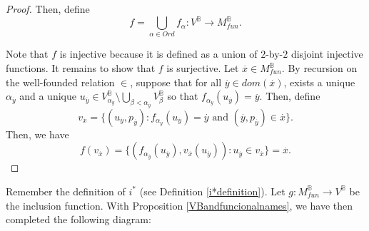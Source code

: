 \documentclass[10pt,longbibliography]{article}
\newcommand{\Po}{\mathbb{P}}
\newcommand{\B}{\mathbb{B}}
\newcommand{\ydot}{\overset{.}{y}}
\newcommand{\xdot}{\overset{.}{x}}
\begin{document}
\begin{proof}
	Then, define
	$$f = \underset{\alpha \in Ord}{\bigcup} f_{\alpha}: V^{\B} \to M^{\B}_{fun}.$$      
	
	Note that $f$ is injective because it is defined as a union of $2$-by-$2$ disjoint injective functions. It remains to show that $f$ is surjective.  Let $\xdot \in M^{\B}_{fun}$. By recursion on the well-founded relation $\in$, suppose that for all $\ydot \in dom(\xdot)$, exists a unique $\alpha_{\ydot}$ and a unique $u_{\ydot} \in V^{\B}_{\alpha_{\ydot}} \setminus \underset{\beta < \alpha_{\ydot}}{\bigcup} V^{\B}_{\beta}$ so that $f_{\alpha_{\ydot}}(u_{\ydot}) = \ydot$. Then, define 
	$$v_{\xdot} = \{(u_{\ydot}, p_{\ydot}): f_{\alpha_{\ydot}}(u_{\ydot}) = \ydot \text{ and }(\ydot,p_{\ydot}) \in \xdot\}.$$
	Then, we have $$f(v_{\xdot}) = \{(f_{\alpha_{\ydot}}(u_{\ydot}), v_{\xdot}(u_{\ydot})): u_{\ydot} \in v_{\xdot}\} = \xdot.$$
\end{proof}

Remember the definition of $i^{*}$ (see Definition \ref{i*definition}). Let $g: M^{\B}_{fun} \to V^{\B}$ be the inclusion function. With Proposition \ref{VBandfuncionalnames}, we have then completed the following diagram:

\begin{center}
	
\end{center}
\end{document}

